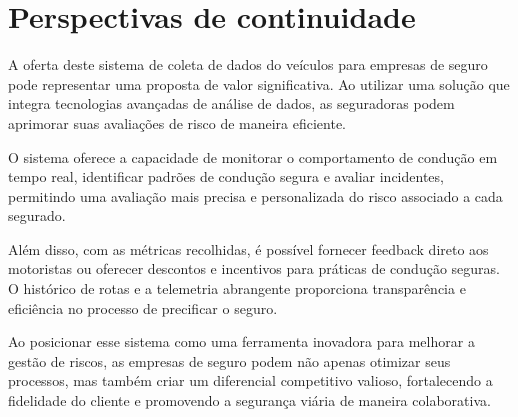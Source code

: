 \section{Perspectivas de continuidade}
A oferta deste sistema de coleta de dados do veículos para empresas de seguro pode representar uma proposta de valor significativa. Ao utilizar uma solução que integra tecnologias avançadas de análise de dados, as seguradoras podem aprimorar suas avaliações de risco de maneira eficiente. 

O sistema oferece a capacidade de monitorar o comportamento de condução em tempo real, identificar padrões de condução segura e avaliar incidentes, permitindo uma avaliação mais precisa e personalizada do risco associado a cada segurado. 

Além disso, com as métricas recolhidas, é possível fornecer feedback direto aos motoristas ou oferecer descontos e incentivos para práticas de condução seguras. O histórico de rotas e a telemetria abrangente proporciona transparência e eficiência no processo de precificar o seguro. 

Ao posicionar esse sistema como uma ferramenta inovadora para melhorar a gestão de riscos, as empresas de seguro podem não apenas otimizar seus processos, mas também criar um diferencial competitivo valioso, fortalecendo a fidelidade do cliente e promovendo a segurança viária de maneira colaborativa.